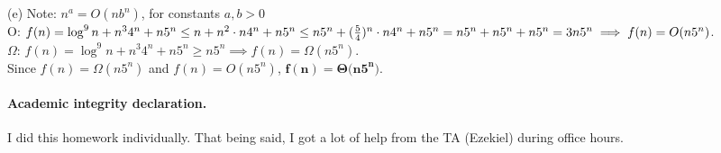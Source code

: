 \documentclass[11pt]{article}
\begin{document}
\begin{solution}
\begin{description}
\item{(e)} Note: $n^a = O(nb^n)$, for constants $ a,b > 0$
\\ O: $f(n) = \log^{9}n + n^3 4^n + n 5^n \leq n + n^2\cdot n4^n + n5^n \leq n5^n + (\frac{5}{4})^n \cdot n4^n + n5^n = n5^n + n5^n + n5^n \\ = 3n5^n \implies f(n) = O(n5^n)$.
\\ $\Omega$: $f(n) = \log^{9}n + n^3 4^n + n 5^n \geq n5^n \implies f(n) = \Omega(n5^n)$.
\\ Since $f(n) = \Omega(n5^n)$ and $f(n) = O(n5^n)$, $\mathbf{f(n) = \Theta(n5^n})$.


\end{description}

\end{solution}

\paragraph{Academic integrity declaration.}
I did this homework individually. That being said, I got a lot of help from the TA (Ezekiel) during office hours.
\end{document}
